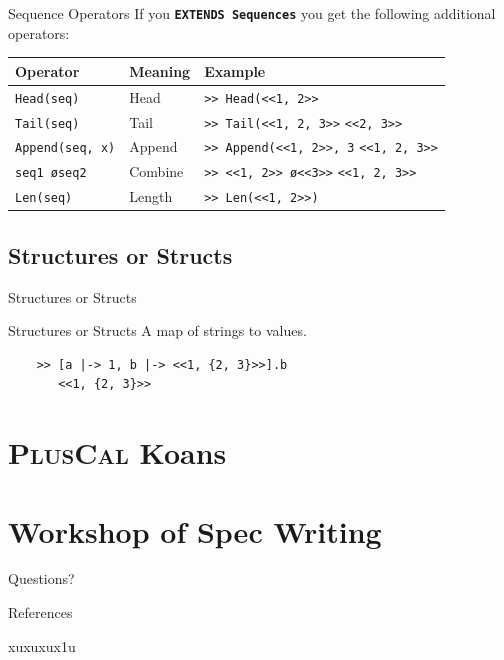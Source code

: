 \documentclass[10pt]{beamer}
\newcommand{\pluscal}{\textbf{\textsc{PlusCal}}\xspace}
\begin{document}
\begin{frame}{Sequence Operators}
  If you \textbf{\texttt{EXTENDS Sequences}} you get the following additional operators:
  \begin{table}
    \begin{tabular}{@{} p{2.5cm}p{2cm}p{3.5cm} @{}}
      \toprule
      Operator & Meaning & Example\\
      \midrule
      \texttt{Head(seq)} & Head & \texttt{>> Head(<<1, 2>>} \newline 1 \\
      \texttt{Tail(seq)} & Tail & \texttt{>> Tail(<<1, 2, 3>>} \newline \texttt{<<2, 3>>} \\
      \texttt{Append(seq, x)} & Append & \texttt{>> Append(<<1, 2>>, 3} \newline \texttt{<<1, 2, 3>>} \\
      \texttt{seq1 \o seq2} & Combine & \texttt{>> <<1, 2>> \o <<3>>} \newline \texttt{<<1, 2, 3>>} \\              \texttt{Len(seq)} & Length & \texttt{>> Len(<<1, 2>>)} \newline 2 \\                
      \bottomrule
    \end{tabular}
  \end{table}
\end{frame}

\subsection{Structures or Structs}

\begin{frame}[fragile]{Structures or Structs}

  \begin{exampleblock}{Structures or Structs}
    A \alert{map} of strings to values.
  \end{exampleblock}

  \begin{verbatim}
    >> [a |-> 1, b |-> <<1, {2, 3}>>].b
       <<1, {2, 3}>>
  \end{verbatim}
\end{frame}




\section{\pluscal Koans}

\section{Workshop of Spec Writing}


\begin{frame}[standout]
  Questions?
\end{frame}

\appendix

\begin{frame}[allowframebreaks]{References}

  \nocite{*}  xuxuxux1u
  

\end{frame}
\end{document}
